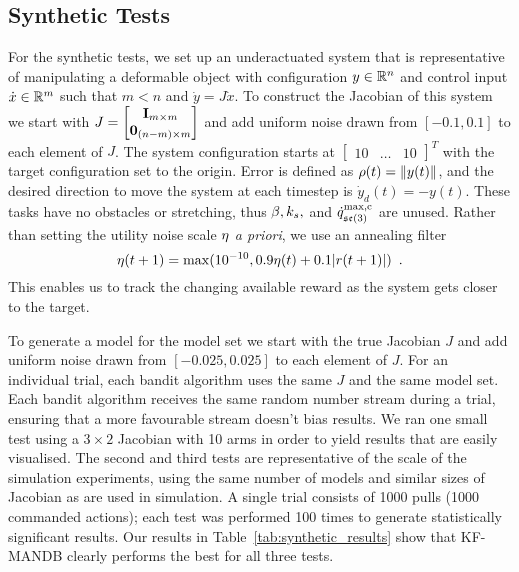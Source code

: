 \subsection{Synthetic Tests}
\label{sec:synthetic_trials}


For the synthetic tests, we set up an underactuated system that is representative of manipulating a deformable object with configuration $y \in \mathbb{R}^n$ and control input $\dot x \in \mathbb{R}^m$ such that $m < n$ and $\dot y = J \dot x$. To construct the Jacobian of this system we start with $J = \begin{bmatrix}\mathbf{I}_{m \times m} \\ \mathbf{0}_{(n-m) \times m} \end{bmatrix}$ and add uniform noise drawn from $[-0.1, 0.1]$ to each element of $J$. The system configuration starts at $\begin{bmatrix}10 & \dots & 10\end{bmatrix}^T$ with the target configuration set to the origin. Error is defined as $\rho(t) = \| y(t) \|$, and the desired direction to move the system at each timestep is $\dot y_d(t) = - y(t)$. These tasks have no obstacles or stretching, thus $\beta, k_s,$ and $\dot{q}^\textrm{max,c}_{\mathfrak{se}(3)}$ are unused. Rather than setting the utility noise scale $\eta$ \textit{a priori}, we use an annealing filter
\begin{equation}
    \eta(t+1) = \max(10^{-10}, 0.9 \eta(t) + 0.1 |r(t+1)|) \enspace.
\end{equation}
This enables us to track the changing available reward as the system gets closer to the target.

To generate a model for the model set we start with the true Jacobian $J$ and add uniform noise drawn from $[-0.025, 0.025]$ to each element of $J$. For an individual trial, each bandit algorithm uses the same $J$ and the same model set. Each bandit algorithm receives the same random number stream during a trial, ensuring that a more favourable stream doesn't bias results. We ran one small test using a $3 \times 2$ Jacobian with 10 arms in order to yield results that are easily visualised. The second and third tests are representative of the scale of the simulation experiments, using the same number of models and similar sizes of Jacobian as are used in simulation. A single trial consists of 1000 pulls (1000 commanded actions); each test was performed 100 times to generate statistically significant results. Our results in Table~\ref{tab:synthetic_results} show that KF-MANDB clearly performs the best for all three tests.


